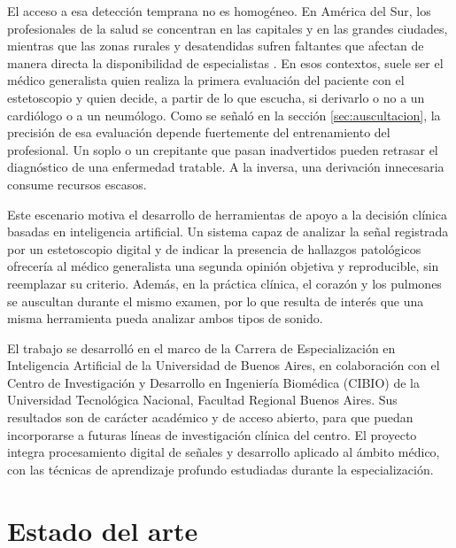 El acceso a esa detección temprana no es homogéneo. En América del Sur, los profesionales de la
salud se concentran en las capitales y en las grandes ciudades, mientras que las zonas rurales y
desatendidas sufren faltantes que afectan de manera directa la disponibilidad de especialistas
\citep{paho2026brechas}. En esos contextos, suele ser el médico generalista quien realiza la primera
evaluación del paciente con el estetoscopio y quien decide, a partir de lo que escucha, si derivarlo
o no a un cardiólogo o a un neumólogo. Como se señaló en la sección \ref{sec:auscultacion}, la
precisión de esa evaluación depende fuertemente del entrenamiento del profesional. Un soplo o un
crepitante que pasan inadvertidos pueden retrasar el diagnóstico de una enfermedad tratable. A la
inversa, una derivación innecesaria consume recursos escasos.

Este escenario motiva el desarrollo de herramientas de apoyo a la decisión clínica basadas en
inteligencia artificial. Un sistema capaz de analizar la señal registrada por un estetoscopio
digital y de indicar la presencia de hallazgos patológicos ofrecería al médico generalista una
segunda opinión objetiva y reproducible, sin reemplazar su criterio. Además, en la práctica clínica,
el corazón y los pulmones se auscultan durante el mismo examen, por lo que resulta de interés que
una misma herramienta pueda analizar ambos tipos de sonido.

El trabajo se desarrolló en el marco de la Carrera de Especialización en Inteligencia Artificial de
la Universidad de Buenos Aires, en colaboración con el Centro de Investigación y Desarrollo en
Ingeniería Biomédica (CIBIO) de la Universidad Tecnológica Nacional, Facultad Regional Buenos Aires.
Sus resultados son de carácter académico y de acceso abierto, para que puedan incorporarse a futuras
líneas de investigación clínica del centro. El proyecto integra procesamiento digital de señales y
desarrollo aplicado al ámbito médico, con las técnicas de aprendizaje profundo estudiadas durante la
especialización.


\section{Estado del arte}
\label{sec:estadoArte}

